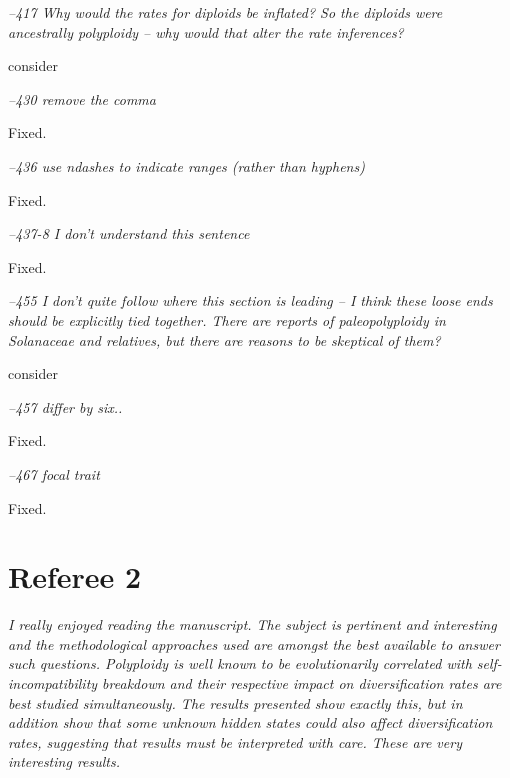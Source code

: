 \documentclass[11pt]{article}
\renewenvironment{quote}{\bigskip\noindent\itshape\ignorespaces}{\smallskip}
\begin{document}
\begin{quote}
--417  Why would the rates for diploids be inflated?
So the diploids were ancestrally polyploidy -- why would that alter the rate inferences?
\end{quote}

consider %

\begin{quote}
--430  remove the comma
\end{quote}

Fixed.

\begin{quote}
--436  use ndashes to indicate ranges (rather than hyphens)
\end{quote}

Fixed.

\begin{quote}
--437-8 I don't understand this sentence
\end{quote}

Fixed.

\begin{quote}
--455  I don't quite follow where this section is leading -- I think these loose ends should be explicitly tied together.
There are reports of paleopolyploidy in Solanaceae and relatives, but there are reasons to be skeptical of them?
\end{quote}

consider %

\begin{quote}
--457  differ by six..
\end{quote}

Fixed.

\begin{quote}
--467  focal trait
\end{quote}

Fixed.

\section{Referee 2}
\vspace{-11pt}

\begin{quote}
I really enjoyed reading the manuscript.
The subject is pertinent and interesting and the methodological approaches used are amongst the best available to answer such questions.
Polyploidy is well known to be evolutionarily correlated with self-incompatibility breakdown and their respective impact on diversification rates are best studied simultaneously.
The results presented show exactly this, but in addition show that some unknown hidden states could also affect diversification rates, suggesting that results must be interpreted with care.
These are very interesting results.
\end{quote}
\end{document}
